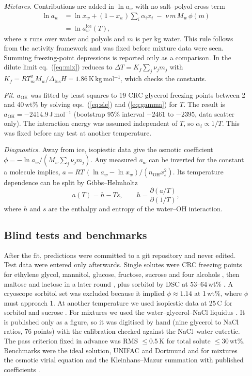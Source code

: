 \documentclass[10pt,a4paper,twocolumn]{article}
\newcommand{\dfus}{\Delta_{\mathrm{fus}}}
\newcommand{\aoh}{a_{\mathrm{OH}}}
\begin{document}
\emph{Mixtures.} Contributions are added in $\ln a_w$ with no salt--polyol cross term
\begin{equation}
\begin{split}
\ln a_w&=\ln x_w+(1-x_w)\textstyle\sum_i\alpha_i x_i\;-\;\nu\,m\,M_w\,\phi(m)\\
&=\ln a_w^{\mathrm{ice}}(T),
\end{split}
\label{eq:mix}
\end{equation}
where $x$ runs over water and polyols and $m$ is per kg water. This rule follows from the activity framework
and was fixed before mixture data were seen. Summing freezing-point depressions \cite{km} is reported only as a
comparison. In the dilute limit eq.~(\ref{eq:mix}) reduces to $\Delta T=K_f\sum_j\nu_jm_j$ with
$K_f=RT_m^2M_w/\dfus H=1.86$\,K\,kg\,mol$^{-1}$, which checks the constants.

\emph{Fit.} $\aoh$ was fitted by least squares to 19 CRC glycerol freezing points between 2 and 40\,wt\%
\cite{crc} by solving eqs.~(\ref{eq:sle}) and (\ref{eq:gamma}) for $T$. The result is
$\aoh=-2414.9$\,J\,mol$^{-1}$ (bootstrap 95\% interval $-2461$ to $-2395$, data scatter only). The interaction
energy was assumed independent of $T$, so $\alpha_i\propto1/T$. This was fixed before any test at another
temperature.

\emph{Diagnostics.} Away from ice, isopiestic data give the osmotic coefficient
$\phi=-\ln a_w/(M_w\sum_j\nu_jm_j)$. Any measured $a_w$ can be inverted for the constant a molecule implies,
$a=RT\,(\ln a_w-\ln x_w)/(n_{\mathrm{OH}}x_s^2)$. Its temperature dependence can be split by Gibbs--Helmholtz
\begin{equation}
a(T)=h-Ts,\qquad h=\frac{\partial(a/T)}{\partial(1/T)},
\label{eq:gh}
\end{equation}
where $h$ and $s$ are the enthalpy and entropy of the water--OH interaction.

\subsection{Blind tests and benchmarks}
After the fit, predictions were committed to a git repository and never edited. Test data were entered only
afterwards. Single solutes were CRC freezing points for ethylene glycol, mannitol, glucose, fructose, sucrose
and four alcohols \cite{crc}, then maltose and lactose in a later round \cite{crc}, plus sorbitol by DSC at
53--64\,wt\% \cite{siniti}. A cryoscope sorbitol set \cite{baer} was excluded because it implied
$\phi\approx1.14$ at 1\,wt\%, where $\phi$ must approach 1. At another temperature we used isopiestic data at
25\,\textdegree C for sorbitol \cite{bower} and sucrose \cite{robinson}. For mixtures we used the
water--glycerol--NaCl liquidus \cite{shepard}. It is published only as a figure, so it was digitised by hand
(nine glycerol to NaCl ratios, 76 points) with the calibration checked against the NaCl--water eutectic. The
pass criterion fixed in advance was RMS $\le0.5$\,K for total solute $\le30$\,wt\%. Benchmarks were the ideal
solution, UNIFAC and Dortmund \cite{unifac,dortmund,thermo} and for mixtures the osmotic virial equation and the
Kleinhans--Mazur summation with published coefficients \cite{zielinski,km}.
\end{document}
